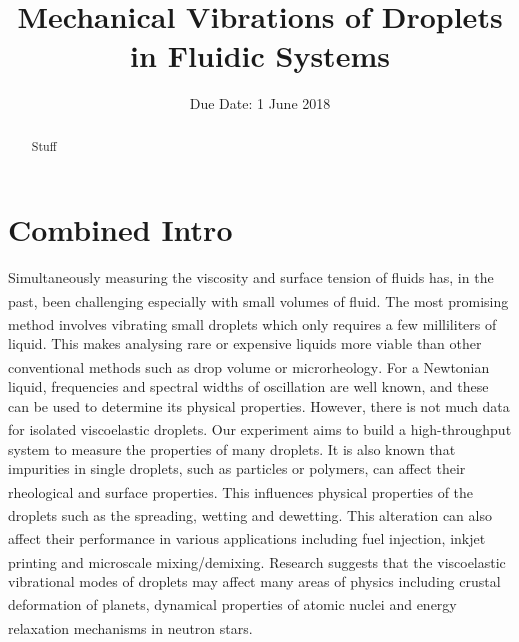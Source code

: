 \documentclass{physics_article_B}
\title{Mechanical Vibrations of Droplets in Fluidic Systems}
\date{Due Date: 1 June 2018}
\begin{document}
	
\setcounter{page}{0}
%

\begin{abstract}
	\large{Stuff
}
\end{abstract}
	

\tableofcontents

\setcounter{page}{1}
	
\newpage
{} 
\setcounter{page}{1}


\section{Combined Intro\label{sect:intro}}

Simultaneously measuring the viscosity and surface tension of fluids has, in the past, been challenging especially with small volumes of fluid\textsuperscript{\cite{harrold}}. The most promising method involves vibrating small droplets\textsuperscript{\cite{harrold}} which only requires a few milliliters of liquid. This makes analysing rare or expensive liquids more viable than other conventional methods such as drop volume or microrheology\textsuperscript{\cite{harrold2}}. For a Newtonian liquid, frequencies and spectral widths of oscillation are well known, and these can be used to determine its physical properties. However, there is not much data for isolated viscoelastic droplets\textsuperscript{\cite{temperton}}. Our experiment aims to build a high-throughput system to measure the properties of many droplets. It is also known that impurities in single droplets, such as particles or polymers, can affect their rheological and surface properties\textsuperscript{\cite{temperton}}. This influences physical properties of the droplets such as the spreading, wetting and dewetting\textsuperscript{\cite{bergeron}}. This alteration can also affect their performance in various applications including fuel injection\textsuperscript{\cite{vukasinovic}}, inkjet printing and microscale mixing/demixing\textsuperscript{\cite{mugele}}. Research suggests that the viscoelastic vibrational modes of droplets may affect many areas of physics including crustal deformation of planets\textsuperscript{\cite{pollitz}}, dynamical properties of atomic nuclei\textsuperscript{\cite{wong}} and energy relaxation mechanisms in neutron stars\textsuperscript{\cite{bastrukov}}. 
\end{document}
